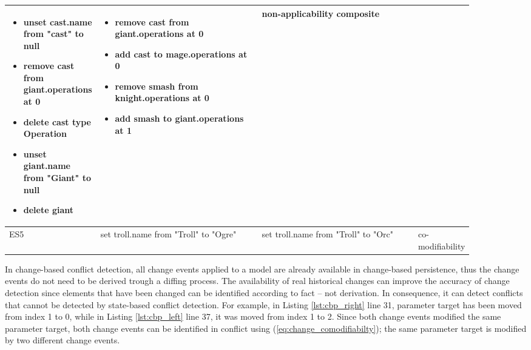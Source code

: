 \begin{table}[ht]
\begin{tabular}{|p{0.04\linewidth}|p{0.37\linewidth}|p{0.37\linewidth}|
        p{0.11\linewidth}|}
\begin{minipage}[t]{\linewidth}
\begin{itemize}[leftmargin=0pt]
          \setlength
          \item[] unset cast.name from "cast" to null
          \item[] remove cast from giant.operations at 0
          \item[] delete cast type Operation
          \item[] unset giant.name from "Giant" to null
          \item[] delete giant
        \end{itemize}
      \end{minipage}
      & 
      \begin{minipage}[t]{\linewidth}
        \raggedright
        \begin{itemize}[leftmargin=0pt]
          \setlength
          \item[] remove cast from giant.operations at 0
          \item[] add cast to mage.operations at 0
          \item[] remove smash from knight.operations at 0
          \item[] add smash to giant.operations at 1
        \end{itemize}
      \end{minipage}
      & 
      non-applicability composite\\
      \hline
      ES5 & 
      set troll.name from "Troll" to "Ogre" & 
      set troll.name from "Troll" to "Orc" & 
      co-modifiability\\ 
      \hline
    \end{tabular}
\end{table}



In change-based conflict detection, all change events applied to a model are already available in change-based persistence, thus the change events do not need to be derived trough a diffing process. The availability of real historical changes can improve the accuracy of change detection since elements that have been changed can be identified according to fact -- not derivation. In consequence, it can detect conflicts that cannot be detected by state-based conflict detection. For example, in Listing \ref{lst:cbp_right} line 31, parameter \textsf{target} has been moved from index 1 to 0, while in Listing \ref{lst:cbp_left} line 37, it was moved from index 1 to 2. Since both change events modified the same parameter \textsf{target}, both change events can be identified in conflict using (\ref{eq:change_comodifiabilty}); the same parameter \textsf{target} is modified by two different change events. 


